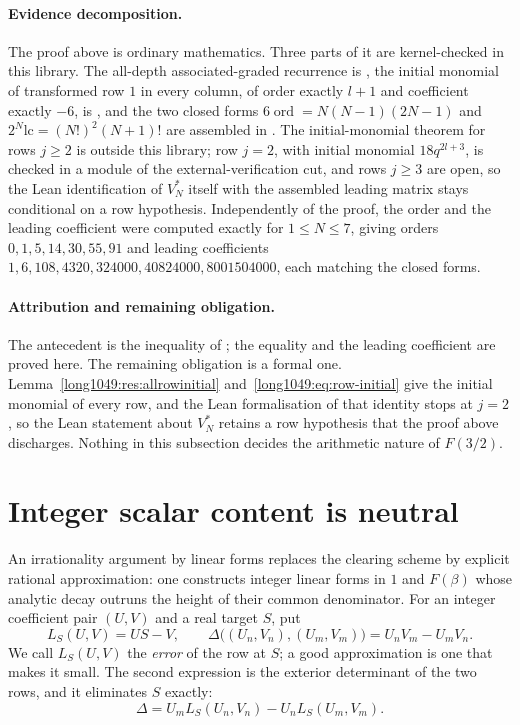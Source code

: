 \documentclass[11pt]{article}
\begin{document}
\paragraph{Evidence decomposition.}
The proof above is ordinary mathematics.  Three parts of it are kernel-checked
in this library.  The all-depth
associated-graded recurrence is
,
the initial monomial of transformed row $1$ in every column, of order exactly
$l+1$ and coefficient exactly $-6$, is
,
and the two closed forms $6\operatorname{ord}=N(N-1)(2N-1)$ and
$2^{N}\mathrm{lc}=(N!)^{2}(N+1)!$ are assembled in
.  The initial-monomial theorem for rows $j\ge2$ is outside this
library; row $j=2$, with initial monomial $18q^{2l+3}$, is checked in a module
of the external-verification cut, and rows $j\ge3$ are open, so the Lean
identification of $V_N^{*}$ itself with the assembled leading matrix stays
conditional on a row hypothesis.  Independently of the proof, the order and the
leading coefficient were computed exactly for $1\le N\le7$, giving orders
$0,1,5,14,30,55,91$ and leading coefficients
$1,6,108,4320,324000,40824000,8001504000$, each matching the closed forms.

\paragraph{Attribution and remaining obligation.}
The antecedent is the inequality of \cite[Sec.~4]{zudilin2016}; the equality and
the leading coefficient are proved here.  The remaining obligation is a formal
one.  Lemma~\ref{long1049:res:allrowinitial} and~\eqref{long1049:eq:row-initial} give the initial monomial of every row, and the Lean
formalisation of that identity stops at $j=2$, so the Lean statement about
$V_N^{*}$ retains a row hypothesis that the proof above discharges.  Nothing in
this subsection decides the arithmetic nature of $F(3/2)$.

\section{Integer scalar content is neutral}\label{long1049:sec:primitive}

An irrationality argument by linear forms replaces the clearing scheme by
explicit rational approximation: one constructs integer linear forms in $1$ and
$F(\beta)$ whose analytic decay outruns the height of their common denominator.
For an integer coefficient pair \((U,V)\) and a real target \(S\), put
\[
 L_S(U,V)=US-V,
 \qquad
 \Delta\bigl((U_n,V_n),(U_m,V_m)\bigr)=U_nV_m-U_mV_n.
\]
We call \(L_S(U,V)\) the \emph{error} of the row at \(S\); a good approximation
is one that makes it small.  The second expression is the exterior determinant
of the two rows, and it eliminates \(S\) exactly:
\[
\Delta=U_mL_S(U_n,V_n)-U_nL_S(U_m,V_m).
\]
\end{document}
